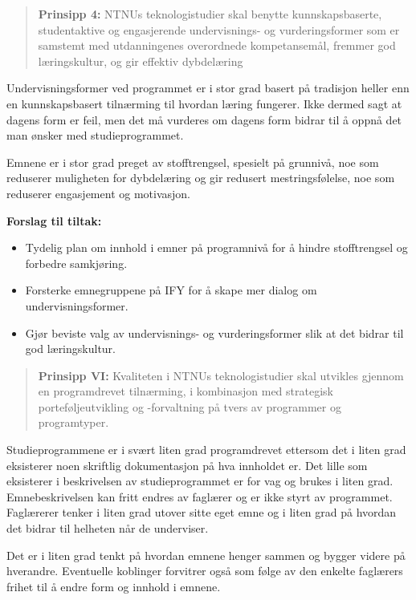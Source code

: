 \begin{quote}
	\textbf{Prinsipp 4:} NTNUs teknologistudier skal benytte kunnskapsbaserte, studentaktive og engasjerende undervisnings- og vurderingsformer som er samstemt med utdanningenes overordnede kompetansemål, fremmer god læringskultur, og gir effektiv dybdelæring
\end{quote}

Undervisningsformer ved programmet er i stor grad basert på tradisjon heller enn en kunnskapsbasert tilnærming til hvordan læring fungerer. Ikke dermed sagt at dagens form er feil, men det må vurderes om dagens form bidrar til å oppnå det man ønsker med studieprogrammet.

Emnene er i stor grad preget av stofftrengsel, spesielt på grunnivå, noe som reduserer muligheten for dybdelæring og gir redusert mestringsfølelse, noe som reduserer engasjement og motivasjon.

\textbf{Forslag til tiltak:}

\begin{itemize}
	\item Tydelig plan om innhold i emner på programnivå for å hindre stofftrengsel og forbedre samkjøring.
	\item Forsterke emnegruppene på IFY for å skape mer dialog om undervisningsformer.
	\item Gjør beviste valg av undervisnings- og vurderingsformer slik at det bidrar til god læringskultur.
\end{itemize}

\begin{quote}
	\textbf{Prinsipp VI:} Kvaliteten i NTNUs teknologistudier skal utvikles gjennom en programdrevet tilnærming, i kombinasjon med strategisk porteføljeutvikling og -forvaltning på tvers av programmer og programtyper.
\end{quote}

Studieprogrammene er i svært liten grad programdrevet ettersom det i liten grad eksisterer noen skriftlig dokumentasjon på hva innholdet er. Det lille som eksisterer i beskrivelsen av studieprogrammet er for vag og brukes i liten grad. Emnebeskrivelsen kan fritt endres av faglærer og er ikke styrt av programmet. Faglærerer tenker i liten grad utover sitte eget emne og i liten grad på hvordan det bidrar til helheten når de underviser.

Det er i liten grad tenkt på hvordan emnene henger sammen og bygger videre på hverandre. Eventuelle koblinger forvitrer også som følge av den enkelte faglærers frihet til å endre form og innhold i emnene.


